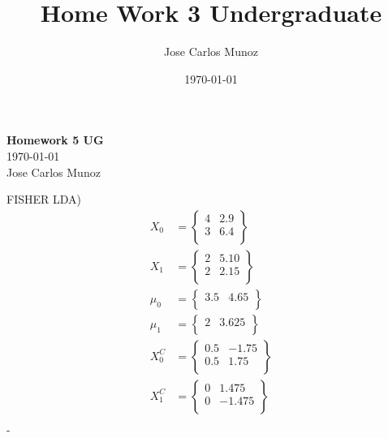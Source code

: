 \documentclass[12pt,english]{article}
\title{Home Work 3 Undergraduate}
\date{\today}
\author{Jose Carlos Munoz}
\begin{document}
\begin{center}
    \Large
    \textbf{Homework 5 UG}\\
    \small
    \today\\
    \large
    Jose Carlos Munoz
\end{center}%
FISHER LDA)\\

\begin{equation}
\begin{split}
X_{0} &= 
\begin{Bmatrix}
4 & 2.9 \\
3 & 6.4 \\
\end{Bmatrix}\\
X_{1} &= 
\begin{Bmatrix}
2 & 5.10 \\
2 & 2.15 \\
\end{Bmatrix}\\
\mu_0 &= 
\begin{Bmatrix}
3.5 & 4.65 \\
\end{Bmatrix}\\
\mu_1 &= 
\begin{Bmatrix}
2 & 3.625 \\
\end{Bmatrix}\\
X_{0}^{C} &= 
\begin{Bmatrix}
0.5 & -1.75 \\
0.5 & 1.75 \\
\end{Bmatrix}\\
X_{1}^{C} &= 
\begin{Bmatrix}
0 & 1.475 \\
0 & -1.475 \\
\end{Bmatrix}\\
\end{split} 
\end{equation}
-
\end{document}

